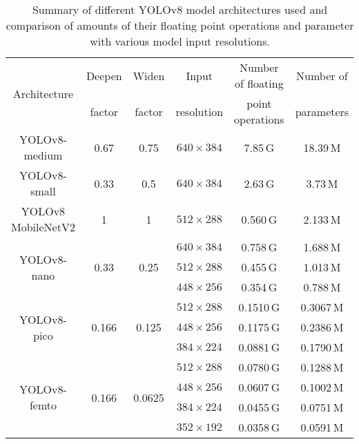 
\begin{table}[h]
\centering
\small
\begin{tabular}{|c|c|c|c|c|c|}
    \hline
    \multirow{2}{*}{Architecture}& Deepen                 & Widen                   & Input      & Number of floating & Number of \\
                                 & factor                 & factor                  & resolution & point operations   & parameters \\
    \hline
    \hline
    YOLOv8-medium                & 0.67                   & 0.75                    & $640 \times 384$ & 7.85\,G & 18.39\,M \\
    \hline
    YOLOv8-small                 & 0.33                   & 0.5                     & $640 \times 384$ & 2.63\,G & 3.73\,M \\
    \hline
    YOLOv8 MobileNetV2           & 1                      & 1                       & $512 \times 288$ & 0.560\,G & 2.133\,M \\
    \hline
    \multirow{3}{*}{YOLOv8-nano} & \multirow{3}{*}{0.33}  & \multirow{3}{*}{0.25}   & $640 \times 384$ & 0.758\,G & 1.688\,M \\
                                 &                        &                         & $512 \times 288$ & 0.455\,G & 1.013\,M \\
                                 &                        &                         & $448 \times 256$ & 0.354\,G & 0.788\,M \\
    \hline
    \multirow{3}{*}{YOLOv8-pico} & \multirow{3}{*}{0.166} & \multirow{3}{*}{0.125}  & $512 \times 288$ & 0.1510\,G & 0.3067\,M \\
                                 &                        &                         & $448 \times 256$ & 0.1175\,G & 0.2386\,M \\
                                 &                        &                         & $384 \times 224$ & 0.0881\,G & 0.1790\,M \\
    \hline
    \multirow{4}{*}{YOLOv8-femto}& \multirow{4}{*}{0.166} & \multirow{4}{*}{0.0625} & $512 \times 288$ & 0.0780\,G & 0.1288\,M \\
                                 &                        &                         & $448 \times 256$ & 0.0607\,G & 0.1002\,M \\
                                 &                        &                         & $384 \times 224$ & 0.0455\,G & 0.0751\,M \\
                                 &                        &                         & $352 \times 192$ & 0.0358\,G & 0.0591\,M \\
    \hline
\end{tabular}
\caption{Summary of different YOLOv8 model architectures used and comparison of amounts of their floating point operations and parameter with various model input resolutions.}
\label{ModelArchitectures}
\end{table}



